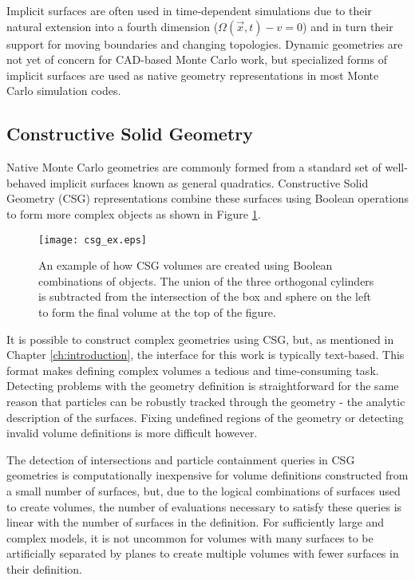 Implicit surfaces are often used in time-dependent simulations due to their
natural extension into a fourth dimension ($ \Omega(\vec{x},t) - v  = 0 $) and
in turn their support for moving boundaries and changing topologies. Dynamic
geometries are not yet of concern for CAD-based Monte Carlo work, but
specialized forms of implicit surfaces are used as native geometry
representations in most Monte Carlo simulation codes.

\subsection{Constructive Solid Geometry}\label{subsec:csg}

Native Monte Carlo geometries are commonly formed from a standard set of
well-behaved implicit surfaces known as general quadratics. Constructive Solid
Geometry (CSG) representations combine these surfaces using Boolean operations to
form more complex objects as shown in Figure \ref{fig:csg_ex}.

\begin{figure}[h]
  \centering
  \texttt{[image: csg\_ex.eps]}
  \caption[Example of CSG Boolean operations.]{An example of how CSG volumes are created using Boolean combinations
    of objects. The union of the three orthogonal cylinders is
    subtracted from the intersection of the box and sphere on the left to form
    the final volume at the top of the figure.}
  \label{fig:csg_ex}
\end{figure}

It is possible to construct complex geometries using CSG, but, as mentioned in
Chapter \ref{ch:introduction}, the interface for this work is typically
text-based. This format makes defining complex volumes a tedious and
time-consuming task. Detecting problems with the geometry definition is
straightforward for the same reason that particles can be robustly tracked
through the geometry - the analytic description of the surfaces. Fixing
undefined regions of the geometry or detecting invalid volume definitions is
more difficult however.

The detection of intersections and particle containment queries in CSG
geometries is computationally inexpensive for volume definitions constructed
from a small number of surfaces, but, due to the logical combinations of
surfaces used to create volumes, the number of evaluations necessary to satisfy
these queries is linear with the number of surfaces in the definition. For
sufficiently large and complex models, it is not uncommon for volumes with many
surfaces to be artificially separated by planes to create multiple volumes with
fewer surfaces in their definition.

